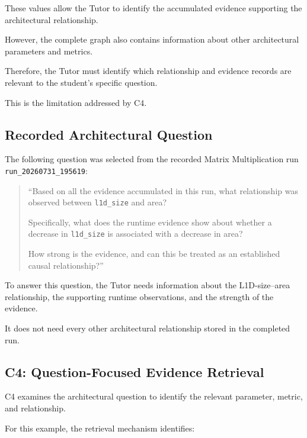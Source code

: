 These values allow the Tutor
to identify the accumulated
evidence supporting the
architectural relationship.

However, the complete graph
also contains information
about other architectural
parameters and metrics.

Therefore, the Tutor must
identify which relationship
and evidence records are
relevant to the student's
specific question.

This is the limitation
addressed by C4.


\subsection{Recorded Architectural Question}

The following question was
selected from the recorded
Matrix Multiplication run
\texttt{run\_20260731\_195619}:

\begin{quote}
``Based on all the evidence accumulated
in this run, what relationship was
observed between \texttt{l1d\_size}
and area?

Specifically, what does the runtime
evidence show about whether a decrease
in \texttt{l1d\_size} is associated
with a decrease in area?

How strong is the evidence,
and can this be treated as
an established causal relationship?''
\end{quote}

To answer this question,
the Tutor needs information
about the L1D-size--area
relationship, the supporting
runtime observations, and
the strength of the evidence.

It does not need every other
architectural relationship
stored in the completed run.


\subsection{C4: Question-Focused Evidence Retrieval}

C4 examines the architectural
question to identify the
relevant parameter, metric,
and relationship.

For this example,
the retrieval mechanism
identifies:

